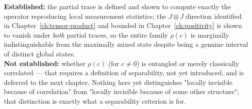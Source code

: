 \begin{ledgerentry}
\textbf{Established:} the partial trace is defined and shown to compute
exactly the operator reproducing local measurement statistics; the $J\otimes
J$ direction identified in Chapter~\ref{ch:tensor-product} and bounded in
Chapter~\ref{ch:positivity} is shown to vanish under \emph{both} partial
traces, so the entire family $\rho(c)$ is marginally indistinguishable from
the maximally mixed state despite being a genuine interval of distinct global
states.\\
\textbf{Not established:} whether $\rho(c)$ (for $c\ne0$) is entangled or
merely classically correlated — that requires a definition of separability,
not yet introduced, and is deferred to the next chapter. Nothing here yet
distinguishes "locally invisible because of correlation" from "locally
invisible because of some other structure"; that distinction is exactly what
a separability criterion is for.
\end{ledgerentry}
